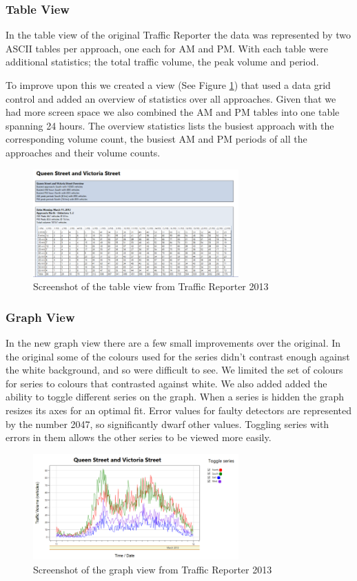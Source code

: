 \documentclass{article}
\begin{document}
\subsubsection{Table View}
In the table view of the original Traffic Reporter the data was represented by two ASCII tables per approach, one each for AM and PM. With each table were additional statistics; the total traffic volume, the peak volume and period. 

To improve upon this we created a view (See Figure \ref{fig:newTable}) that used a data grid control and added an overview of statistics over all approaches. Given that we had more screen space we also combined the AM and PM tables into one table spanning 24 hours.
The overview statistics lists the busiest approach with the corresponding volume count, the busiest AM and PM periods of all the approaches and their volume counts.

\begin{figure}[!t]
\centerline{\includegraphics[width=3.1in]{newTable}}
\caption{Screenshot of the table view from Traffic Reporter 2013}
\label{fig:newTable}
\end{figure}

\subsubsection{Graph View}
In the new graph view there are a few small improvements over the original. In the original some of the colours used for the series didn't contrast enough against the white background, and so were difficult to see. We limited the set of colours for series to colours that contrasted against white. We also added added the ability to toggle different series on the graph. When a series is hidden the graph resizes its axes for an optimal fit. Error values for faulty detectors are represented by the number 2047, so significantly dwarf other values. Toggling series with errors in them allows the other series to be viewed more easily.

\begin{figure}[!b]
\centerline{\includegraphics[width=3.1in]{newGraph}}
\caption{Screenshot of the graph view from Traffic Reporter 2013}
\label{fig:newGraph}
\end{figure}
\end{document}
